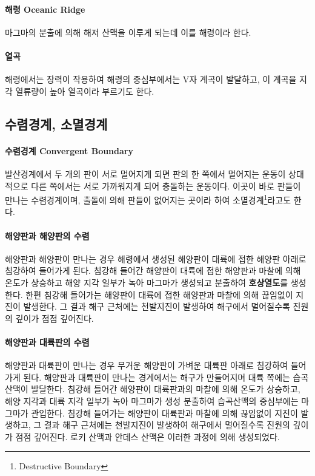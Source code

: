 \documentclass[12pt, a4paper, oneside]{book}
\begin{document}
		\paragraph{해령 Oceanic Ridge}  
		마그마의 분출에 의해 해저 산맥을 이루게 되는데 이를 해령이라 한다.
		\paragraph{열곡} 
		해령에서는 장력이 작용하여 해령의 중심부에서는 V자 계곡이 발달하고, 이 계곡을 지각 열류량이 높아 열곡이라 부르기도 한다.
		
	\clearpage	
	\subsection{수렴경계, 소멸경계}
		\paragraph{수렴경계 Convergent Boundary} 
		발산경계에서 두 개의 판이 서로 멀어지게 되면 판의 한 쪽에서 멀어지는 운동이 상대적으로 다른 쪽에서는 서로 가까워지게 되어 충돌하는 운동이다.
		이곳이 바로 판들이 만나는 수렴경계이며, 출돌에 의해 판들이 없어지는 곳이라 하여 소멸경계\footnote{Destructive Boundary}라고도 한다.
		
	
		\paragraph{해양판과 해양판의 수렴}
		해양판과 해양판이 만나는 경우 해령에서 생성된 해양판이 대륙에 접한 해양판 아래로 침강하여 들어가게 된다. 
		침강해 들어간 해양판이 대륙에 접한 해양판과 마찰에 의해 온도가 상승하고 해양 지각 일부가 녹아 마그마가 생성되고 분출하여 \textbf{호상열도}를 생성한다.
		한편 침강해 들어가는 해양판이 대륙에 접한 해양판과 마찰에 의해 끊임없이 지진이 발생한다.
		그 결과 해구 근처에는 천발지진이 발생하여 해구에서 멀어질수록 진원의 깊이가 점점 깊어진다.
		
	
		\paragraph{해양판과 대륙판의 수렴}	
		해양판과 대륙판이 만나는 경우 무거운 해양판이 가벼운 대륙판 아래로 침강하여 들어가게 된다. 
		해양판과 대륙판이 만나는 경계에서는 해구가 만들어지며 대륙 쪽에는 습곡산맥이 발달한다.
		침강해 들어간 해양판이 대륙판과의 마찰에 의해 온도가 상승하고, 해양 지각과 대륙 지각 일부가 녹아 마그마가 생성 분출하여 습곡산맥의 중심부에는 마그마가 관입한다.
		침강해 들어가는 해양판이 대륙판과 마찰에 의해 끊임없이 지진이 발생하고, 그 결과 해구 근처에는 천발지진이 발생하여 해구에서 멀어질수록 진원의 깊이가 점점 깊어진다. 
		로키 산맥과 안데스 산맥은 이러한 과정에 의해 생성되었다.
		
\end{document}
